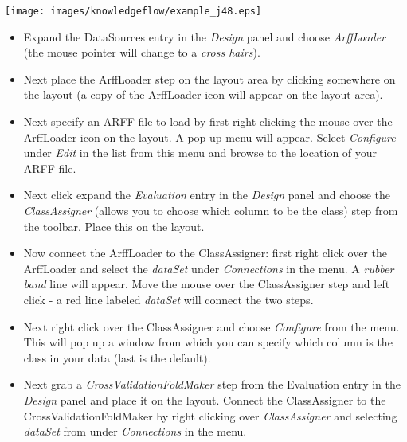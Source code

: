 \begin{center}
  \texttt{[image: images/knowledgeflow/example\_j48.eps]}
\end{center}

\begin{itemize}
	\item Expand the DataSources entry in the \textit{Design} panel and
          choose \textit{ArffLoader} (the mouse pointer will change to
          a \textit{cross hairs}).

	\item Next place the ArffLoader step on the layout area by clicking
	somewhere on the layout (a copy of the ArffLoader icon will appear on
	the layout area).

	\item Next specify an ARFF file to load by first right clicking the mouse
	over the ArffLoader icon on the layout. A pop-up menu will
	appear. Select \textit{Configure} under \textit{Edit} in the list from this menu and
	browse to the location of your ARFF file.

	\item Next click expand the \textit{Evaluation} entry in the
          \textit{Design} panel and choose the \textit{ClassAssigner}
          (allows you to choose which column to be the class)
          step from the toolbar. Place this on the layout.

	\item Now connect the ArffLoader to the ClassAssigner: first right click
	over the ArffLoader and select the \textit{dataSet} under \textit{Connections} in
	the menu. A \textit{rubber band} line will appear. Move the mouse over the
	ClassAssigner step and left click - a red line labeled \textit{dataSet}
	will connect the two steps.

	\item Next right click over the ClassAssigner and choose \textit{Configure} from
	the menu. This will pop up a window from which you can specify which
	column is the class in your data (last is the default).

	\item Next grab a \textit{CrossValidationFoldMaker} step
          from the Evaluation entry in the \textit{Design} panel and
          place it on the layout. Connect the ClassAssigner to the
          CrossValidationFoldMaker by right clicking over
          \textit{ClassAssigner} and selecting \textit{dataSet} from
          under \textit{Connections} in the menu.


\end{itemize}
